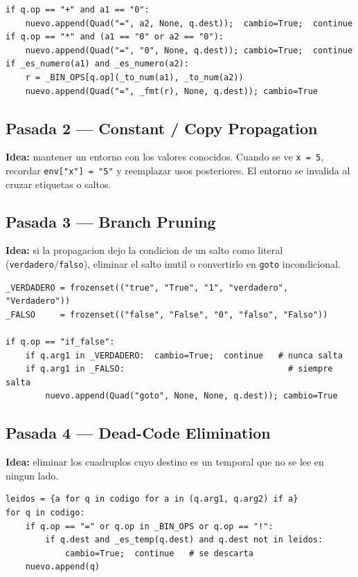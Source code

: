 \documentclass[11pt,a4paper]{article}
\begin{document}
\begin{lstlisting}[style=py]
if q.op == "+" and a1 == "0":
    nuevo.append(Quad("=", a2, None, q.dest));  cambio=True;  continue
if q.op == "*" and (a1 == "0" or a2 == "0"):
    nuevo.append(Quad("=", "0", None, q.dest)); cambio=True;  continue
if _es_numero(a1) and _es_numero(a2):
    r = _BIN_OPS[q.op](_to_num(a1), _to_num(a2))
    nuevo.append(Quad("=", _fmt(r), None, q.dest)); cambio=True
\end{lstlisting}

\subsection{Pasada 2 --- Constant / Copy Propagation}

\textbf{Idea:} mantener un entorno con los valores conocidos. Cuando se
ve \texttt{x = 5}, recordar \texttt{env["x"] = "5"} y reemplazar usos
posteriores. El entorno se invalida al cruzar etiquetas o saltos.

\subsection{Pasada 3 --- Branch Pruning}

\textbf{Idea:} si la propagacion dejo la condicion de un salto como
literal (\texttt{verdadero}/\texttt{falso}), eliminar el salto inutil
o convertirlo en \texttt{goto} incondicional.

\begin{lstlisting}[style=py]
_VERDADERO = frozenset(("true", "True", "1", "verdadero", "Verdadero"))
_FALSO     = frozenset(("false", "False", "0", "falso", "Falso"))

if q.op == "if_false":
    if q.arg1 in _VERDADERO:  cambio=True;  continue   # nunca salta
    if q.arg1 in _FALSO:                                 # siempre salta
        nuevo.append(Quad("goto", None, None, q.dest)); cambio=True
\end{lstlisting}

\subsection{Pasada 4 --- Dead-Code Elimination}

\textbf{Idea:} eliminar los cuadruplos cuyo destino es un temporal que
no se lee en ningun lado.

\begin{lstlisting}[style=py]
leidos = {a for q in codigo for a in (q.arg1, q.arg2) if a}
for q in codigo:
    if q.op == "=" or q.op in _BIN_OPS or q.op == "!":
        if q.dest and _es_temp(q.dest) and q.dest not in leidos:
            cambio=True;  continue   # se descarta
    nuevo.append(q)
\end{lstlisting}
\end{document}

